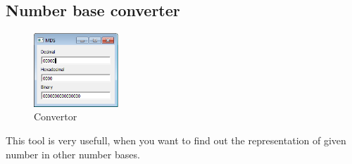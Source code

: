\subsection{Number base converter}
    \begin{figure}
            \centering
            \includegraphics[width=90pt]{img/convertor.png}
            \caption{Convertor}
    \end{figure}
    This tool is very usefull, when you want to find out the representation of given number in other number bases.
